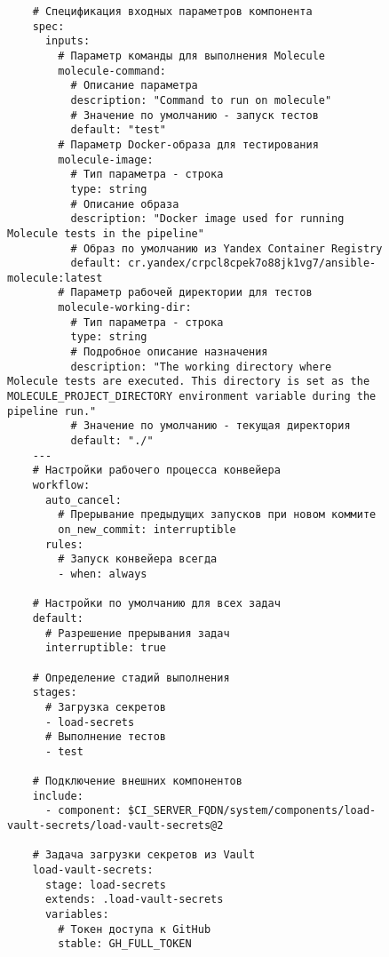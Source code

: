 \begin{figure}[H]
  \centering
  \scriptsize
  \begin{verbatim}
    # Спецификация входных параметров компонента
    spec:
      inputs:
        # Параметр команды для выполнения Molecule
        molecule-command:
          # Описание параметра
          description: "Command to run on molecule"
          # Значение по умолчанию - запуск тестов
          default: "test"
        # Параметр Docker-образа для тестирования
        molecule-image:
          # Тип параметра - строка
          type: string
          # Описание образа
          description: "Docker image used for running Molecule tests in the pipeline"
          # Образ по умолчанию из Yandex Container Registry
          default: cr.yandex/crpcl8cpek7o88jk1vg7/ansible-molecule:latest
        # Параметр рабочей директории для тестов
        molecule-working-dir:
          # Тип параметра - строка
          type: string
          # Подробное описание назначения
          description: "The working directory where Molecule tests are executed. This directory is set as the MOLECULE_PROJECT_DIRECTORY environment variable during the pipeline run."
          # Значение по умолчанию - текущая директория
          default: "./"
    ---
    # Настройки рабочего процесса конвейера
    workflow:
      auto_cancel:
        # Прерывание предыдущих запусков при новом коммите
        on_new_commit: interruptible
      rules:
        # Запуск конвейера всегда
        - when: always

    # Настройки по умолчанию для всех задач
    default:
      # Разрешение прерывания задач
      interruptible: true

    # Определение стадий выполнения
    stages:
      # Загрузка секретов
      - load-secrets
      # Выполнение тестов
      - test

    # Подключение внешних компонентов
    include:
      - component: $CI_SERVER_FQDN/system/components/load-vault-secrets/load-vault-secrets@2

    # Задача загрузки секретов из Vault
    load-vault-secrets:
      stage: load-secrets
      extends: .load-vault-secrets
      variables:
        # Токен доступа к GitHub
        stable: GH_FULL_TOKEN


\end{verbatim}
\end{figure}
